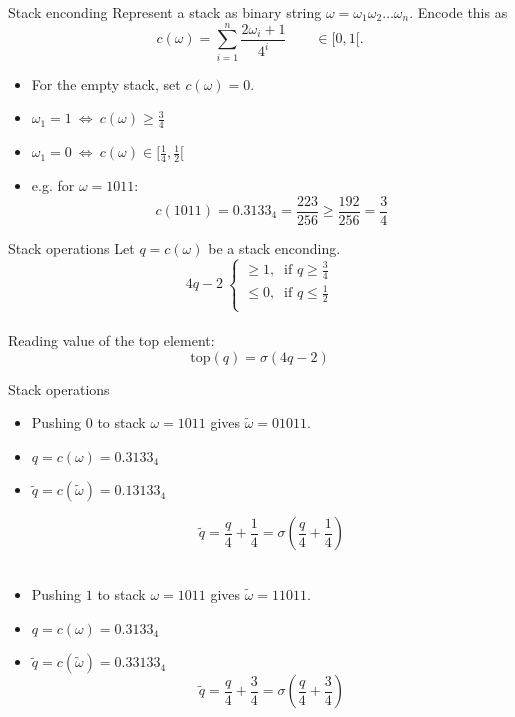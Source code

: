 \begin{frame}{Stack enconding}
Represent a stack as binary string $\omega = \omega_1 \omega_2 \ldots \omega_n$.
Encode this as \[ c(\omega) = \sum_{i=1}^n \frac{2\omega_i + 1}{4^i} \qquad \in [0,1[.\]
\begin{itemize}
\item For the empty stack, set $c(\omega) = 0$.
\item $\omega_1 = 1 \ \Leftrightarrow \ c(\omega) \geq \frac{3}{4}$
\item $\omega_1 = 0 \ \Leftrightarrow \ c(\omega) \in [\frac{1}{4}, \frac{1}{2}[$
\item e.g. for $\omega = 1011$:  \[c(1011) = 0.3133_4 = \frac{223}{256} \geq \frac{192}{256} = \frac{3}{4}\]
\end{itemize}
\end{frame}

\begin{frame}{Stack operations}
Let $q = c(\omega)$ be a stack enconding.\\
\vspace{1em}
 \[4q - 2 \ \begin{cases}
\geq 1, \ \text{ if } q \geq \frac{3}{4}\\
\leq 0, \ \text{ if } q \leq \frac{1}{2}\\
\end{cases}\]\\[1em]
Reading value of the top element: \[\text{top}(q) = \sigma(4q - 2)\]
\end{frame}


\begin{frame}{Stack operations}
\begin{itemize}
\item Pushing $0$ to stack $\omega = 1011$ gives $\tilde{\omega} = 01011$.
\item $q = c(\omega) = 0.3133_4$
\item $\tilde{q} = c(\tilde{\omega}) = 0.13133_4$ 

\[\tilde{q} = \frac{q}{4} + \frac{1}{4} = \sigma(\frac{q}{4} + \frac{1}{4}) \]\\[1ex]
\item Pushing $1$ to stack $\omega = 1011$ gives $\tilde{\omega} = 11011$.
\item $q = c(\omega) = 0.3133_4$
\item $\tilde{q} = c(\tilde{\omega}) = 0.33133_4$ 
\[\tilde{q} = \frac{q}{4} + \frac{3}{4} = \sigma(\frac{q}{4} + \frac{3}{4}) \]
\end{itemize}
\end{frame}

